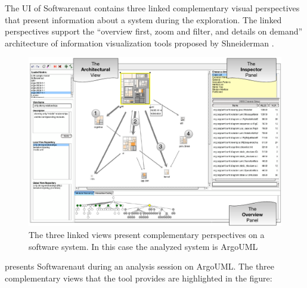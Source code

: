 \documentclass[preprint,12pt]{elsarticle}
\newcommand\on[1]{\nbc{ON}{#1}{red}} %
\begin{document}

The UI of Softwarenaut contains three linked complementary visual perspectives that present information about a system during the exploration. The linked perspectives support the ``overview first, zoom and filter, and details on demand'' architecture of information visualization tools proposed by Shneiderman \cite{shneid-eyes}. 

\begin{figure}[ht]
\begin{center}
\includegraphics[width=\linewidth]{SnautOnArgo.pdf}
\caption{The three linked views present complementary perspectives on a software system. In this case the analyzed system is ArgoUML}
\end{center}
\end{figure}

 presents Softwarenaut during an analysis session on ArgoUML. The three complementary views that the tool provides are highlighted in the figure: 
\end{document}
